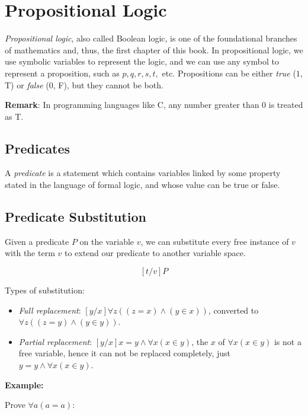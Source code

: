 \chapter{Propositional Logic}

\emph{Propositional logic}, also called Boolean logic, is one of the foundational branches of mathematics and, thus, the
first chapter of this book. In propositional logic, we use symbolic variables to represent the logic, and we can use any symbol to represent a proposition, such as
\(p, q, r, s, t,\) etc. Propositions can be either \emph{true} (\(1\), T) or \emph{false} (\(0\), F), but they cannot be both.

\textbf{Remark}: In programming languages like C, any number greater than 0 is treated as T.

\section{Predicates}

A \emph{predicate} is a statement which contains variables linked by some property stated in the language of formal logic, and whose value can be true or false.

\section{Predicate Substitution}

Given a predicate \(P\) on the variable \(v\), we can substitute every free instance of \(v\) with the term \(v\) to extend
our predicate to another variable space.

\[
	[t/v] P
\]


Types of substitution:

\begin{itemize}

	\item \emph{Full replacement}: \([y/x]\forall z((z = x) \land (y \in x))\), converted to \(\forall z((z = y) \land (y \in y))\).

	\item \emph{Partial replacement}: \([y/ x]x = y \land \forall x (x \in y)\), the \(x\) of \(\forall x(x \in y)\) is not a free variable, hence it can not be
	      replaced completely, just \(y = y \land \forall x (x \in y)\).

\end{itemize}

\textbf{Example:}

Prove \(\forall a (a = a)\):

